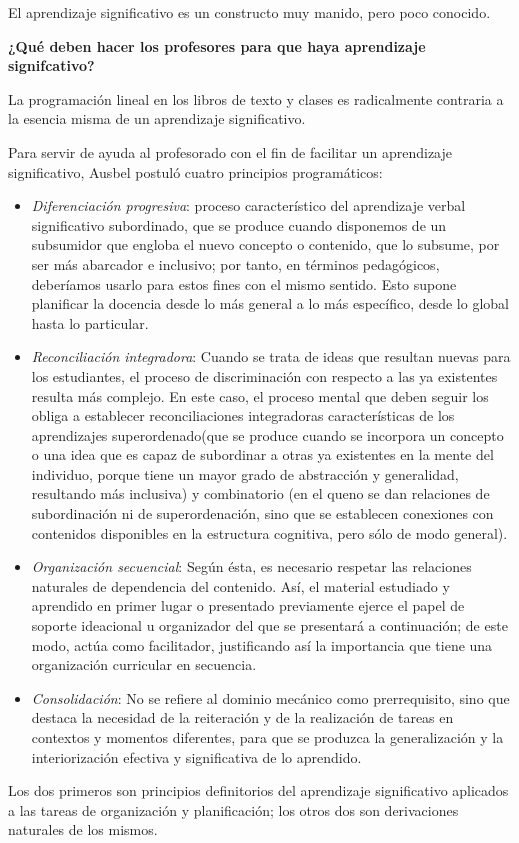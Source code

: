 \documentclass[12pt]{report}
\theoremstyle{largebreak}
\begin{document}
    El aprendizaje significativo es un constructo muy manido, pero poco conocido.

    \begin{center}
        \textbf{¿Qué deben hacer los profesores para que haya aprendizaje signifcativo?}
    \end{center}

    La programación lineal en los libros de texto y clases es radicalmente contraria a la esencia misma de un aprendizaje significativo.

    Para servir de ayuda al profesorado con el fin de facilitar un aprendizaje significativo, Ausbel postuló cuatro principios programáticos:
    \begin{itemize}
        \item \textit{Diferenciación progresiva}: proceso característico del aprendizaje verbal
        significativo subordinado, que se produce cuando disponemos de un subsumidor que
        engloba el nuevo concepto o contenido, que lo subsume, por ser más abarcador e
        inclusivo; por tanto, en términos pedagógicos, deberíamos usarlo para estos fines con
        el mismo sentido. Esto supone planificar la docencia desde lo más general a lo más
        específico, desde lo global hasta lo particular.
        \item \textit{Reconciliación integradora}: Cuando se trata de ideas que resultan nuevas para los estudiantes, el proceso de
        discriminación con respecto a las ya existentes resulta más complejo. En este caso, el
        proceso mental que deben seguir los obliga a establecer reconciliaciones integradoras
        características de los aprendizajes superordenado(que se produce cuando se
        incorpora un concepto o una idea que es capaz de subordinar a otras ya existentes en
        la mente del individuo, porque tiene un mayor grado de abstracción y generalidad,
        resultando más inclusiva) y combinatorio (en el queno se dan relaciones de
        subordinación ni de superordenación, sino que se establecen conexiones con
        contenidos disponibles en la estructura cognitiva, pero sólo de modo general).
        \item \textit{Organización secuencial}: Según ésta, es necesario respetar las relaciones naturales de
        dependencia del contenido. Así, el material estudiado y aprendido en primer lugar o
        presentado previamente ejerce el papel de soporte ideacional u organizador del que se
        presentará a continuación; de este modo, actúa como facilitador, justificando así la
        importancia que tiene una organización curricular en secuencia.
        \item \textit{Consolidación}: No se refiere al
        dominio mecánico como prerrequisito, sino que destaca la necesidad de la reiteración
        y de la realización de tareas en contextos y momentos diferentes, para que se
        produzca la generalización y la interiorización efectiva y significativa de lo
        aprendido.
    \end{itemize}
    Los dos primeros son principios definitorios del aprendizaje significativo aplicados a las tareas de organización y planificación; los otros dos son derivaciones naturales de los
    mismos.
\end{document}
